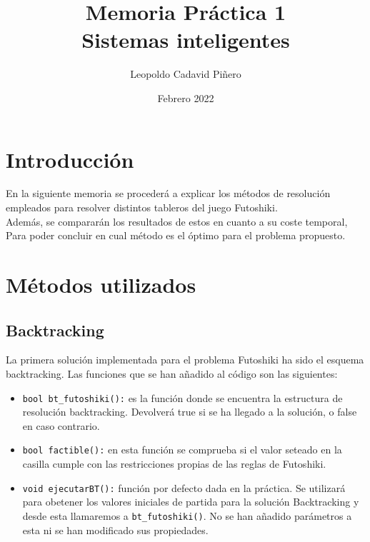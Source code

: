 \documentclass[12pt]{article}
\title{Memoria Práctica 1 \\


\large Sistemas inteligentes
}
\author{
Leopoldo Cadavid Piñero
}
\date{Febrero 2022}
\begin{document}
\maketitle

\section{Introducción}

      En la siguiente memoria se procederá a explicar los métodos de resolución
      empleados para resolver distintos tableros del juego Futoshiki.\\

      Además, se compararán los resultados de estos en cuanto a su coste temporal,
      Para poder concluir en cual método es el óptimo para el problema propuesto. 
      

\section{Métodos utilizados}

\subsection{Backtracking}
La primera solución implementada para el problema Futoshiki ha sido el 
esquema backtracking. Las funciones que se han añadido al código son las 
siguientes:\\
\begin{itemize}
    \item \verb|bool bt_futoshiki():| es la función donde se encuentra la estructura
     de resolución backtracking. Devolverá true si se ha llegado a la solución, o false 
     en caso contrario. 

    \item \verb|bool factible():| en esta función se comprueba si el valor 
    seteado en la casilla cumple con las restricciones propias de las reglas de Futoshiki.

    \item \verb|void ejecutarBT():| función por defecto dada en la práctica. Se utilizará
    para obetener los valores iniciales de partida para la solución Backtracking
    y desde esta llamaremos a \verb|bt_futoshiki()|. No se han añadido parámetros a esta ni se han 
    modificado sus propiedades.

    
\end{itemize}

\end{document}
